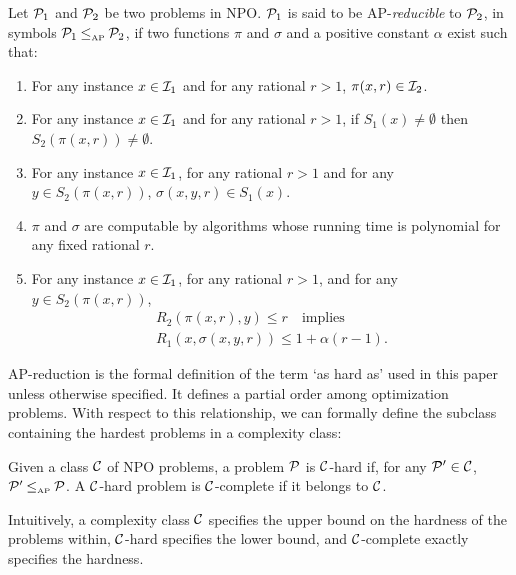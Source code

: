\begin{definition}\label{def:AP-red}
Let $\P_1$ and $\P_2$ be two problems in NPO. $\P_1$ is said to be AP-{\em reducible} to $\P_2$, in symbols $\P_1 \leqAP \P_2$, if two functions $\pi$ and $\sigma$ and a positive constant $\alpha$ exist such that:
\begin{enumerate}
\item For any instance $x\in \I_1$ and for any rational $r > 1$, $\pi(x, r) \in \I_2$.
\item For any instance $x\in \I_1$ and for any rational $r > 1$, if $S_1(x) \neq \emptyset$ then $S_2(\pi(x,r)) \neq \emptyset$.
\item For any instance $x\in \I_1$, for any rational $r > 1$ and for any $y \in S_2(\pi(x,r))$, $\sigma(x, y, r) \in S_1(x)$.
\item $\pi$ and $\sigma$ are computable by algorithms whose running time is polynomial for any fixed rational $r$.
\item For any instance $x\in \I_1$, for any rational $r > 1$, and for any $y \in S_2(\pi(x,r))$,
\begin{align} \label{eq:AP-red}
R_2(\pi(x,r),y) \leq r \quad \text{implies} \\
R_1(x, \sigma(x, y, r)) \leq 1 + \alpha(r-1).
\end{align}
\end{enumerate}
\end{definition}

AP-reduction is the formal definition of the term `as hard as' used in this paper unless otherwise specified. It defines a partial order among optimization problems. With respect to this relationship, we can formally define the subclass containing the hardest problems in a complexity class:

\begin{definition}\label{def:complete} Given a class $\C$ of NPO problems, a problem $\P$ is $\C$-hard if, for any $\P' \in \C$, $\P' \leqAP \P$. A $\C$-hard problem is $\C$-complete if it belongs to $\C$.
\end{definition}

Intuitively, a complexity class $\C$ specifies the upper bound on the hardness of the problems within, $\C$-hard specifies the lower bound, and $\C$-complete exactly specifies the hardness.